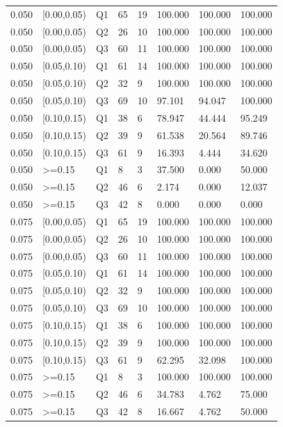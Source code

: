 \begin{tabular}{llllllll}
0.050 & [0.00,0.05) & Q1 & 65 & 19 & 100.000 & 100.000 & 100.000 \\
0.050 & [0.00,0.05) & Q2 & 26 & 10 & 100.000 & 100.000 & 100.000 \\
0.050 & [0.00,0.05) & Q3 & 60 & 11 & 100.000 & 100.000 & 100.000 \\
0.050 & [0.05,0.10) & Q1 & 61 & 14 & 100.000 & 100.000 & 100.000 \\
0.050 & [0.05,0.10) & Q2 & 32 & 9 & 100.000 & 100.000 & 100.000 \\
0.050 & [0.05,0.10) & Q3 & 69 & 10 & 97.101 & 94.047 & 100.000 \\
0.050 & [0.10,0.15) & Q1 & 38 & 6 & 78.947 & 44.444 & 95.249 \\
0.050 & [0.10,0.15) & Q2 & 39 & 9 & 61.538 & 20.564 & 89.746 \\
0.050 & [0.10,0.15) & Q3 & 61 & 9 & 16.393 & 4.444 & 34.620 \\
0.050 & >=0.15 & Q1 & 8 & 3 & 37.500 & 0.000 & 50.000 \\
0.050 & >=0.15 & Q2 & 46 & 6 & 2.174 & 0.000 & 12.037 \\
0.050 & >=0.15 & Q3 & 42 & 8 & 0.000 & 0.000 & 0.000 \\
0.075 & [0.00,0.05) & Q1 & 65 & 19 & 100.000 & 100.000 & 100.000 \\
0.075 & [0.00,0.05) & Q2 & 26 & 10 & 100.000 & 100.000 & 100.000 \\
0.075 & [0.00,0.05) & Q3 & 60 & 11 & 100.000 & 100.000 & 100.000 \\
0.075 & [0.05,0.10) & Q1 & 61 & 14 & 100.000 & 100.000 & 100.000 \\
0.075 & [0.05,0.10) & Q2 & 32 & 9 & 100.000 & 100.000 & 100.000 \\
0.075 & [0.05,0.10) & Q3 & 69 & 10 & 100.000 & 100.000 & 100.000 \\
0.075 & [0.10,0.15) & Q1 & 38 & 6 & 100.000 & 100.000 & 100.000 \\
0.075 & [0.10,0.15) & Q2 & 39 & 9 & 100.000 & 100.000 & 100.000 \\
0.075 & [0.10,0.15) & Q3 & 61 & 9 & 62.295 & 32.098 & 100.000 \\
0.075 & >=0.15 & Q1 & 8 & 3 & 100.000 & 100.000 & 100.000 \\
0.075 & >=0.15 & Q2 & 46 & 6 & 34.783 & 4.762 & 75.000 \\
0.075 & >=0.15 & Q3 & 42 & 8 & 16.667 & 4.762 & 50.000 \\
\hline
\end{tabular}
